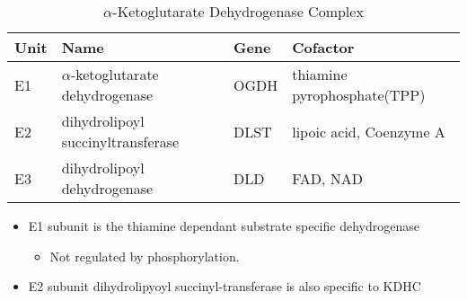 \documentclass{scrartcl}
\begin{document}

\begin{table}[htbp]
\caption{\label{tab:orgf7dfeba}
\(\alpha\)-Ketoglutarate Dehydrogenase Complex}
\centering
\begin{tabular}{llll}
Unit & Name & Gene & Cofactor\\
\hline
E1 & \(\alpha\)-ketoglutarate dehydrogenase & OGDH & thiamine pyrophosphate(TPP)\\
E2 & dihydrolipoyl succinyltransferase & DLST & lipoic acid, Coenzyme A\\
E3 & dihydrolipoyl dehydrogenase & DLD & FAD, NAD\\
\end{tabular}
\end{table}

\begin{itemize}
\item E1 subunit is the thiamine dependant substrate specific dehydrogenase
\begin{itemize}
\item Not regulated by phosphorylation.
\end{itemize}
\item E2 subunit dihydrolipyoyl succinyl-transferase is also specific to KDHC
\end{itemize}
\end{document}

